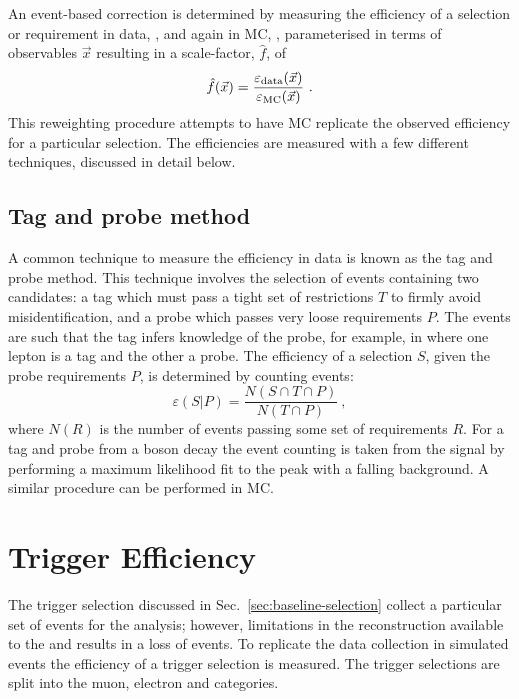 An event-based correction is determined by measuring the efficiency of a selection or requirement in data, \effdata, and again in MC, \effmc, parameterised in terms of observables $\vec{x}$ resulting in a scale-factor, $\hat{f}$, of
%
\begin{equation}
    \hat{f}(\vec{x}) = \frac{\varepsilon_{\mathrm{data}}(\vec{x})}{\varepsilon_{\mathrm{MC}}(\vec{x})}\ .
\end{equation}
%
This reweighting procedure attempts to have MC replicate the observed efficiency for a particular selection. The efficiencies are measured with a few different techniques, discussed in detail below.


\subsection{Tag and probe method}

A common technique to measure the efficiency in data is known as the tag and probe method. This technique involves the selection of events containing two candidates: a tag which must pass a tight set of restrictions $T$ to firmly avoid misidentification, and a probe which passes very loose requirements $P$. The events are such that the tag infers knowledge of the probe, for example, in \IDYll where one lepton is a tag and the other a probe. The efficiency of a selection $S$, given the probe requirements $P$, is determined by counting events:
%
\begin{equation}
    \varepsilon(S|P) = \frac{N(S\cap T\cap P)}{N(T\cap P)}\ ,
\end{equation}
%
where $N(R)$ is the number of events passing some set of requirements $R$. For a tag and probe from a \PZ boson decay the event counting is taken from the signal by performing a maximum likelihood fit to the \PZ peak with a falling background. A similar procedure can be performed in MC.


\section{Trigger Efficiency}

The trigger selection discussed in Sec.~\ref{sec:baseline-selection} collect a particular set of events for the analysis; however, limitations in the reconstruction available to the \HWT and \SWT results in a loss of events. To replicate the data collection in simulated events the efficiency of a trigger selection is measured. The trigger selections are split into the muon, electron and \ptmiss categories.


